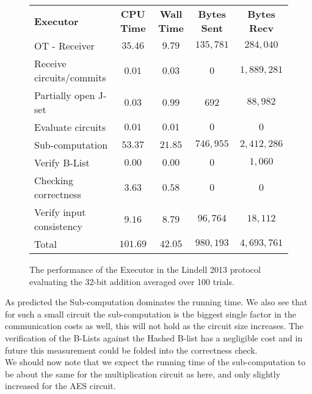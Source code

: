\documentclass[ %
                    author={Nicholas Tutte},
                supervisor={Prof. Nigel Smart},
                    degree={MEng},
                     title={Secure Two Party Computation},
                  subtitle={A practical comparison of recent protocols},
                      type={Research - GG1K},
                      year={2015} ]{dissertation}
\begin{document}
				\begin{figure}[!ht]
					\begin{tabular}{| p{4.3cm} | c c c c |}
						\hline
						\textbf{Executor} & \textbf{CPU Time} & \textbf{Wall Time} & \textbf{Bytes Sent} & \textbf{Bytes Recv} \\
						\thickhline
						OT - Receiver & $35.46$ & $9.79$ & $135,781$ & $284,040$ \\
						\hline
						Receive circuits/commits & $0.01$ & $0.03$ & $0$ & $1,889,281$ \\
						\hline
						Partially open J-set & $0.03$ & $0.99$ & $692$ & $88,982$ \\
						\hline
						Evaluate circuits & $0.01$ & $0.01$ & $0$ & $0$ \\
						\hline
						Sub-computation & $53.37$ & $21.85$ & $746,955$ & $2,412,286$ \\
						\hline
						Verify B-List & $0.00$ & $0.00$ & $0$ & $1,060$ \\
						\hline
						Checking correctness & $3.63$ & $0.58$ & $0$ & $0$ \\
						\hline
						Verify input consistency & $9.16$ & $8.79$ & $96,764$ & $18,112$ \\
						\thickhline
						Total & $101.69$ & $42.05$ & $980,193$ & $4,693,761$ \\
						\hline
					\end{tabular}
					\caption{The performance of the Executor in the Lindell 2013 protocol evaluating the 32-bit addition averaged over 100 trials. \label{table:L_2013_Add_Executor}}
				\end{figure}
				\FloatBarrier

				As predicted the Sub-computation dominates the running time. We also see that for such a small circuit the sub-computation is the biggest single factor in the communication costs as well, this will not hold as the circuit size increases. The verification of the B-Lists against the Hashed B-list has a negligible cost and in future this measurement could be folded into the correctness check.\\

				We should now note that we expect the running time of the sub-computation to be about the same for the multiplication circuit as here, and only slightly increased for the AES circuit.\\
\end{document}
